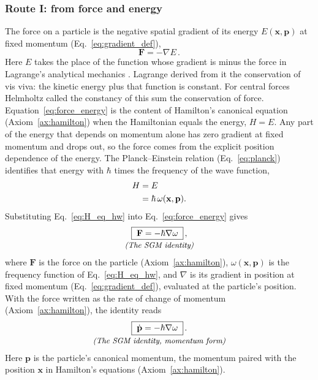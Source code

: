 \documentclass[aps,prd,onecolumn,tightenlines,nofootinbib,notitlepage,11pt,floatfix]{revtex4-2}
\theoremstyle{indentedtheorem}
\begin{document}
\subsubsection{Route I: from force and energy}
\label{sec:route_energy}

The force on a particle is the negative spatial gradient of its energy $E(\mathbf{x},\mathbf{p})$ at fixed momentum (Eq.~\eqref{eq:gradient_def}),
\begin{equation}
    \mathbf{F} = -\nabla E \, .
    \label{eq:force_energy}
\end{equation}
Here $E$ takes the place of the function whose gradient is minus the force in Lagrange's analytical mechanics \cite{Lagrange1788Mecanique}. Lagrange derived from it the conservation of vis viva: the kinetic energy plus that function is constant. For central forces Helmholtz \cite{Helmholtz1847Erhaltung} called the constancy of this sum the conservation of force. Equation~\eqref{eq:force_energy} is the content of Hamilton's canonical equation (Axiom~\ref{ax:hamilton}) when the Hamiltonian equals the energy, $H=E$. Any part of the energy that depends on momentum alone has zero gradient at fixed momentum and drops out, so the force comes from the explicit position dependence of the energy. The Planck--Einstein relation (Eq.~\eqref{eq:planck}) identifies that energy with $\hbar$ times the frequency of the wave function,
\begin{align}
    H &= E \notag\\
      &= \hbar\,\omega(\mathbf{x},\mathbf{p}) .
    \label{eq:H_eq_hw}
\end{align}
Substituting Eq.~\eqref{eq:H_eq_hw} into Eq.~\eqref{eq:force_energy} gives
\begin{equation}
    \begin{gathered}
    \boxed{\; \mathbf{F} = -\hbar\nabla\omega \;} \, , \\[-3pt]
    \text{\small\itshape (The SGM identity)}
    \end{gathered}
    \label{eq:sgm}
\end{equation}
where $\mathbf{F}$ is the force on the particle (Axiom~\ref{ax:hamilton}), $\omega(\mathbf{x},\mathbf{p})$ is the frequency function of Eq.~\eqref{eq:H_eq_hw}, and $\nabla$ is its gradient in position at fixed momentum (Eq.~\eqref{eq:gradient_def}), evaluated at the particle's position. With the force written as the rate of change of momentum (Axiom~\ref{ax:hamilton}), the identity reads
\begin{equation}
    \begin{gathered}
    \boxed{\; \dot{\mathbf{p}} = -\hbar\nabla\omega \;} \, . \\[-3pt]
    \text{\small\itshape (The SGM identity, momentum form)}
    \end{gathered}
    \label{eq:sgm_as_dot_p}
\end{equation}
Here $\mathbf{p}$ is the particle's canonical momentum, the momentum paired with the position $\mathbf{x}$ in Hamilton's equations (Axiom~\ref{ax:hamilton}).
\end{document}
